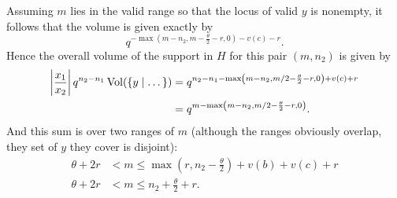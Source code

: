 Assuming $m$ lies in the valid range so that the locus of valid $y$ is nonempty,
it follows that the volume is given exactly by
\[ q^{-\max(m-n_2, m - \frac{\theta}{2} - r, 0) - v(c) - r}. \]
Hence the overall volume of the support in $H$ for this pair $(m, n_2)$ is given by
\begin{align*}
  \left\lvert \frac{x_1}{x_2} \right\rvert q^{n_2 - n_1} \operatorname{Vol}(\{ y \mid \dots \})
  &= q^{n_2 - n_1 - \max\left( m-n_2, m/2 - \frac{\theta}{2} - r, 0 \right) + v(c) + r} \\
  &= q^{m - \max\left( m-n_2, m/2 - \frac{\theta}{2} - r, 0 \right)}.
\end{align*}
And this sum is over two ranges of $m$
(although the ranges obviously overlap, they set of $y$ they cover is disjoint):
\begin{align*}
  \theta + 2r & < m \le \max\left( r, n_2 - \frac{\theta}{2} \right) + v(b) + v(c) + r \\
  \theta + 2r & < m \le n_2 + \frac{\theta}{2} + r.
\end{align*}

